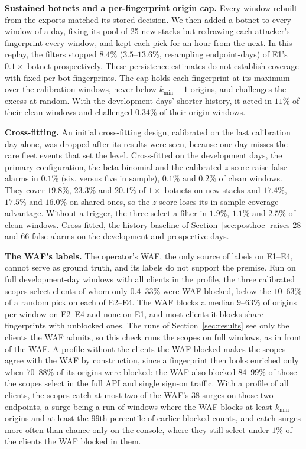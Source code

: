 \documentclass[conference,letterpaper,10pt]{IEEEtran}
\newcommand\1{\textit{(i)}}
\newcommand\2{\textit{(ii)}}
\newcommand\3{\textit{(iii)}}
\newcommand\4{\textit{(iv)}}
\newcommand\5{\textit{(v)}}
\newcommand\6{\textit{(vi)}}
\newcommand\7{\textit{(vii)}}
\newcommand\8{\textit{(viii)}}
\newcommand\9{\textit{(ix)}}
\begin{document}
\textbf{Sustained botnets and a per-fingerprint origin cap.} Every window rebuilt from the exports matched its stored decision. We then added a botnet to every window of a day, fixing its pool of 25 new stacks but redrawing each attacker's fingerprint every window, and kept each pick for an hour from the next. In this replay, the filters stopped $8.4\%$ ($3.5$--$13.6\%$, resampling endpoint-days) of E1's $0.1\times$ botnet prospectively. These persistence estimates do not establish coverage with fixed per-bot fingerprints. The cap holds each fingerprint at its maximum over the calibration windows, never below $k_{\min}-1$ origins, and challenges the excess at random. With the development days' shorter history, it acted in $11\%$ of their clean windows and challenged $0.34\%$ of their origin-windows.

\textbf{Cross-fitting.} An initial cross-fitting design, calibrated on the last calibration day alone, was dropped after its results were seen, because one day misses the rare fleet events that set the level. Cross-fitted on the development days, the primary configuration, the beta-binomial and the calibrated $z$-score raise false alarms in $0.1\%$ (six, versus five in sample), $0.1\%$ and $0.2\%$ of clean windows. They cover $19.8\%$, $23.3\%$ and $20.1\%$ of $1\times$ botnets on new stacks and $17.4\%$, $17.5\%$ and $16.0\%$ on shared ones, so the $z$-score loses its in-sample coverage advantage. Without a trigger, the three select a filter in $1.9\%$, $1.1\%$ and $2.5\%$ of clean windows. Cross-fitted, the history baseline of Section~\ref{sec:posthoc} raises 28 and 66 false alarms on the development and prospective days.

\textbf{The WAF's labels.} The operator's WAF, the only source of labels on E1--E4, cannot serve as ground truth, and its labels do not support the premise. Run on full development-day windows with all clients in the profile, the three calibrated scopes select clients of whom only $0.4$--$33\%$ were WAF-blocked, below the $10$--$63\%$ of a random pick on each of E2--E4. The WAF blocks a median $9$--$63\%$ of origins per window on E2--E4 and none on E1, and most clients it blocks share fingerprints with unblocked ones. The runs of Section~\ref{sec:results} see only the clients the WAF admits, so this check runs the scopes on full windows, as in front of the WAF. A profile without the clients the WAF blocked makes the scopes agree with the WAF by construction, since a fingerprint then looks enriched only when $70$--$88\%$ of its origins were blocked: the WAF also blocked $84$--$99\%$ of those the scopes select in the full API and single sign-on traffic. With a profile of all clients, the scopes catch at most two of the WAF's 38 surges on those two endpoints, a surge being a run of windows where the WAF blocks at least $k_{\min}$ origins and at least the 99th percentile of earlier blocked counts, and catch surges more often than chance only on the console, where they still select under $1\%$ of the clients the WAF blocked in them.
\end{document}
